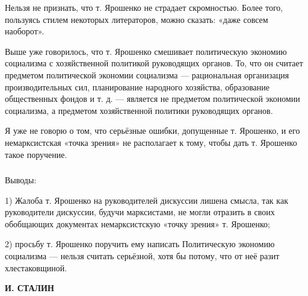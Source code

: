 \documentclass[12pt, a4paper, openany]{book}
\begin{document}
Нельзя не признать, что т. Ярошенко не страдает скромностью. Более того, пользуясь стилем некоторых литераторов, можно сказать: «даже совсем наоборот».



Выше уже говорилось, что т. Ярошенко смешивает политическую экономию социализма с хозяйственной политикой руководящих органов. То, что он считает предметом политической экономии социализма — рациональная организация производительных сил, планирование народного хозяйства, образование общественных фондов и т. д. — является не предметом политической экономии социализма, а предметом хозяйственной политики руководящих органов.



Я уже не говорю о том, что серьёзные ошибки, допущенные т. Ярошенко, и его немарксистская «точка зрения» не располагает к тому, чтобы дать т. Ярошенко такое поручение.



\subsubsection*{\centering{* * *}}



Выводы:



1) Жалоба т. Ярошенко на руководителей дискуссии лишена смысла, так как руководители дискуссии, будучи марксистами, не могли отразить в своих обобщающих документах немарксистскую «точку зрения» т. Ярошенко;



2) просьбу т. Ярошенко поручить ему написать Политическую экономию социализма — нельзя считать серьёзной, хотя бы потому, что от неё разит хлестаковщиной.





\begin{flushright}



\textbf{И. СТАЛИН}



\end{flushright}






\newpage

\thispagestyle{empty} %
\end{document}
